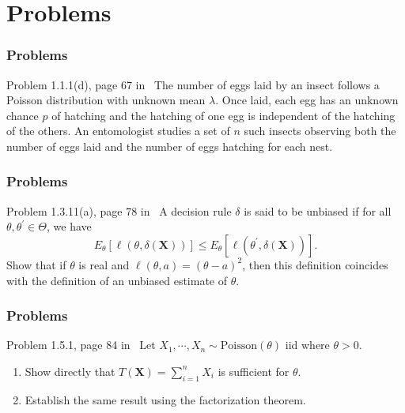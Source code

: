 \documentclass[serif,mathserif,professionalfont]{beamer}
\begin{document}
\section{Problems}



\begin{frame}
	
	\frametitle{Problems}
	
	\begin{block}{Problem 1.1.1(d), page 67 in~\cite{BD2015}}
		The number of eggs laid by an insect follows a Poisson distribution with unknown mean $ \lambda $. Once laid, each egg has an unknown chance $ p $ of hatching and the hatching of one egg is independent of the hatching of the others. An entomologist studies a set of $ n $ such insects observing both the number of eggs laid and the number of eggs hatching for each nest.
	\end{block}
	
	
\end{frame}




\begin{frame}
	
	\frametitle{Problems}
	
	\begin{block}{Problem 1.3.11(a), page 78 in~\cite{BD2015}}
		A decision rule $ \delta $ is said to be unbiased if for all $ \theta, \theta^\prime \in \Theta $, we have
		\begin{equation*}
		E_{\theta}\left[\ell\left(\theta, \delta\left(\bm{X} \right) \right) \right] \leq E_{\theta}\left[\ell\left(\theta^\prime, \delta\left(\bm{X} \right) \right) \right].
		\end{equation*}
		Show that if $ \theta $ is real and $ \ell\left(\theta, a \right) = \left(\theta - a \right)^2 $, then this definition coincides with the definition of an unbiased estimate of $ \theta $.
	\end{block}
	
\end{frame}



\begin{frame}
	
	\frametitle{Problems}
	
	\begin{block}{Problem 1.5.1, page 84 in~\cite{BD2015}}
		Let $ X_1, \cdots, X_n \sim \text{Poisson}\left(\theta \right) $ iid where $\theta > 0 $.
		\begin{enumerate}
			\item Show directly that $ T\left(\bm{X} \right) = \sum_{i=1}^{n} X_i $ is sufficient for $ \theta $.
			\item Establish the same result using the factorization theorem.
		\end{enumerate}
	\end{block}
	
	
\end{frame}
\end{document}

